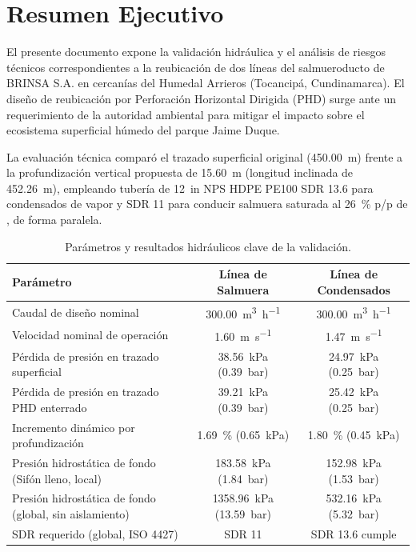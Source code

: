 \newpage
\section*{Resumen Ejecutivo}

El presente documento expone la validación hidráulica y el análisis de riesgos técnicos correspondientes a la reubicación de dos líneas del salmueroducto de BRINSA S.A. en cercanías del Humedal Arrieros (Tocancipá, Cundinamarca). El diseño de reubicación por Perforación Horizontal Dirigida (PHD) surge ante un requerimiento de la autoridad ambiental para mitigar el impacto sobre el ecosistema superficial húmedo del parque Jaime Duque.

La evaluación técnica comparó el trazado superficial original (\SI{450.00}{\meter}) frente a la profundización vertical propuesta de \SI{15.60}{\meter} (longitud inclinada de \SI{452.26}{\meter}), empleando tubería de \SI{12}{in} NPS HDPE PE100 SDR 13.6 para condensados de vapor y SDR 11 para conducir salmuera saturada al \SI{26}{\percent} p/p de , de forma paralela.

\begin{table}[htbp]
    \centering
    \caption{Parámetros y resultados hidráulicos clave de la validación.}
    \label{tab:resumen_ejecutivo}
    \begin{tabularx}{\textwidth}{@{}Xcc@{}}
        \toprule
        \textbf{Parámetro} & \textbf{Línea de Salmuera} & \textbf{Línea de Condensados} \\
        \midrule
        Caudal de diseño nominal & \SI{300.00}{\cubic\meter\per\hour} & \SI{300.00}{\cubic\meter\per\hour} \\
        Velocidad nominal de operación & \SI{1.60}{\meter\per\second} & \SI{1.47}{\meter\per\second} \\
        Pérdida de presión en trazado superficial & \SI{38.56}{\kilo\pascal} (\SI{0.39}{bar}) & \SI{24.97}{\kilo\pascal} (\SI{0.25}{bar}) \\
        Pérdida de presión en trazado PHD enterrado & \SI{39.21}{\kilo\pascal} (\SI{0.39}{bar}) & \SI{25.42}{\kilo\pascal} (\SI{0.25}{bar}) \\
        Incremento dinámico por profundización & \SI{1.69}{\percent} (\SI{0.65}{\kilo\pascal}) & \SI{1.80}{\percent} (\SI{0.45}{\kilo\pascal}) \\
        Presión hidrostática de fondo (Sifón lleno, local) & \SI{183.58}{\kilo\pascal} (\SI{1.84}{bar}) & \SI{152.98}{\kilo\pascal} (\SI{1.53}{bar}) \\
        Presión hidrostática de fondo (global, sin aislamiento) & \SI{1358.96}{\kilo\pascal} (\SI{13.59}{bar}) & \SI{532.16}{\kilo\pascal} (\SI{5.32}{bar}) \\
        SDR requerido (global, ISO 4427) & SDR 11 & SDR 13.6 cumple \\
        \bottomrule
    \end{tabularx}
\end{table}

